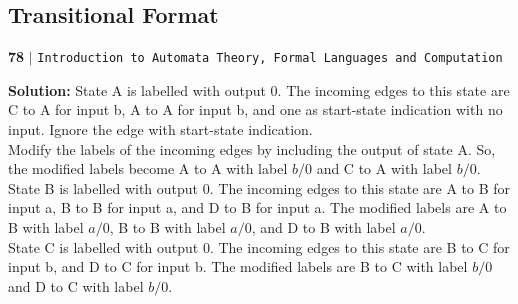 \documentclass[9pt]{beamer}
\begin{document}
\begin{frame}
\section*{Transitional Format}
\begin{flushleft}
    \textbf{78}\hspace*{0.1cm} \textbf{$|$} \hspace*{0.1cm} \texttt{Introduction to Automata Theory, Formal Languages and Computation}
  \end{flushleft}

\vspace*{0.5cm}
\textbf{Solution:} State A is labelled with output $0$. The incoming edges to this state are C to A for input b, A to
A for input b, and one as start-state indication with no input. Ignore the edge with start-state indication.\\
 \hspace*{0.2cm} Modify the labels of the incoming edges by including the output of state A. So, the modified labels
become A to A with label $b/0$ and C to A with label $b/0$.\\
 \hspace*{0.2cm} State B is labelled with output $0$. The incoming edges to this state are A to B for input a, B to B for
input a, and D to B for input a. The modified labels are A to B with label $a/0$, B to B with label $a/0$, and
D to B with label $a/0$.\\
 \hspace*{0.2cm} State C is labelled with output $0$. The incoming edges to this state are B to C for input b, and D to C
for input b. The modified labels are B to C with label $b/0$ and D to C with label $b/0$.\\
\end{frame}
\end{document}
